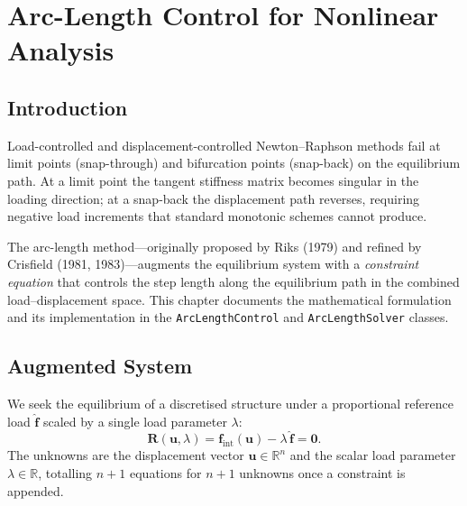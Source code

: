 
\chapter{Arc-Length Control for Nonlinear Analysis}
\label{ch:arc-length}


\section{Introduction}
\label{sec:arc-intro}

Load-controlled and displacement-controlled Newton–Raphson methods
fail at limit points (snap-through) and bifurcation points
(snap-back) on the equilibrium path.  At a limit point the tangent
stiffness matrix becomes singular in the loading direction; at a
snap-back the displacement path reverses, requiring negative load
increments that standard monotonic schemes cannot produce.

The arc-length method---originally proposed by Riks (1979) and refined
by Crisfield (1981, 1983)---augments the equilibrium system with a
\emph{constraint equation} that controls the step length along the
equilibrium path in the combined load--displacement space.  This
chapter documents the mathematical formulation and its implementation
in the \texttt{ArcLengthControl} and \texttt{ArcLengthSolver} classes.


\section{Augmented System}
\label{sec:arc-augmented}

We seek the equilibrium of a discretised structure under a
proportional reference load $\hat{\mathbf{f}}$ scaled by a single
load parameter $\lambda$:
\begin{equation}
  \label{eq:arc-equilibrium}
  \mathbf{R}(\mathbf{u}, \lambda)
  = \mathbf{f}_{\text{int}}(\mathbf{u})
    - \lambda \, \hat{\mathbf{f}} = \mathbf{0}.
\end{equation}
The unknowns are the displacement vector
$\mathbf{u} \in \mathbb{R}^n$ and the scalar load parameter
$\lambda \in \mathbb{R}$, totalling $n + 1$ equations for $n + 1$
unknowns once a constraint is appended.

